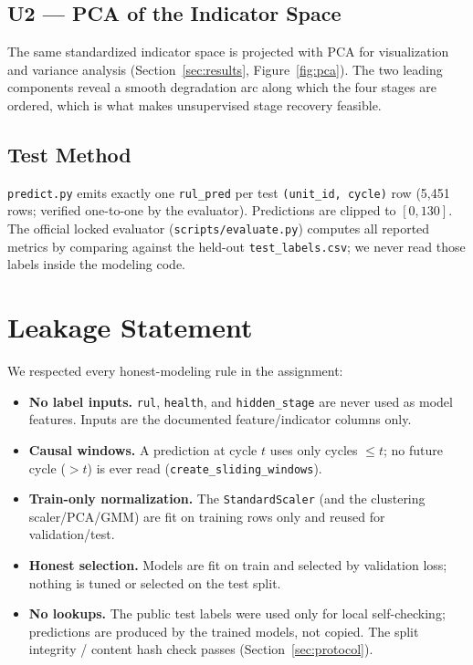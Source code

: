 \documentclass[11pt,a4paper]{article}
\newcommand{\code}[1]{\texttt{\small #1}}
\begin{document}
\subsection{U2 --- PCA of the Indicator Space}
The same standardized indicator space is projected with PCA for visualization
and variance analysis (Section~\ref{sec:results}, Figure~\ref{fig:pca}). The two
leading components reveal a smooth degradation arc along which the four stages
are ordered, which is what makes unsupervised stage recovery feasible.

\subsection{Test Method}
\code{predict.py} emits exactly one \code{rul\_pred} per test
\code{(unit\_id, cycle)} row (5{,}451 rows; verified one-to-one by the
evaluator). Predictions are clipped to $[0,130]$. The official locked evaluator
(\code{scripts/evaluate.py}) computes all reported metrics by comparing against
the held-out \code{test\_labels.csv}; we never read those labels inside the
modeling code.

\section{Leakage Statement}\label{sec:leakage}

We respected every honest-modeling rule in the assignment:
\begin{itemize}[nosep]
  \item \textbf{No label inputs.} \code{rul}, \code{health}, and
        \code{hidden\_stage} are never used as model features. Inputs are the
        documented feature/indicator columns only.
  \item \textbf{Causal windows.} A prediction at cycle $t$ uses only cycles
        $\le t$; no future cycle ($>t$) is ever read
        (\code{create\_sliding\_windows}).
  \item \textbf{Train-only normalization.} The \code{StandardScaler} (and the
        clustering scaler/PCA/GMM) are fit on training rows only and reused for
        validation/test.
  \item \textbf{Honest selection.} Models are fit on train and selected by
        validation loss; nothing is tuned or selected on the test split.
  \item \textbf{No lookups.} The public test labels were used only for local
        self-checking; predictions are produced by the trained models, not
        copied. The split integrity / content hash check passes
        (Section~\ref{sec:protocol}).
\end{itemize}
\end{document}
